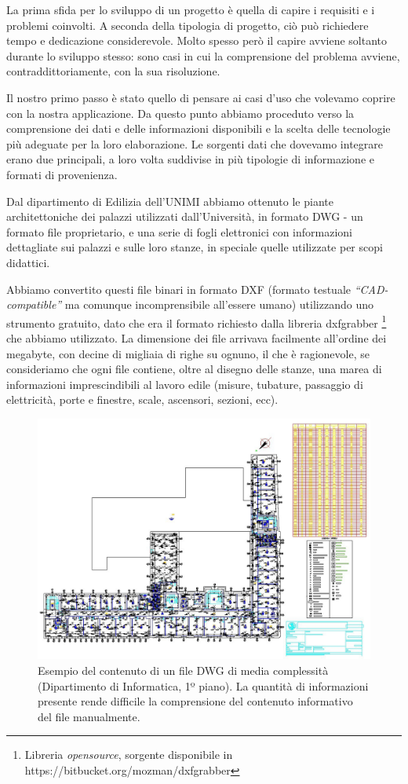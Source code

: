\documentclass[12pt]{report}
\begin{document}
La prima sfida per lo sviluppo di un progetto è quella di capire i
requisiti e i problemi coinvolti. A seconda della tipologia di
progetto, ciò può richiedere tempo e dedicazione considerevole. Molto
spesso però il capire avviene soltanto durante lo sviluppo stesso:
sono casi in cui la comprensione del problema avviene, contraddittoriamente,
con la sua risoluzione.

Il nostro primo passo è stato quello di pensare ai casi d'uso che
volevamo coprire con la nostra applicazione. Da questo punto abbiamo
proceduto verso la comprensione dei dati e delle informazioni
disponibili e la scelta delle tecnologie più adeguate per la loro
elaborazione. Le sorgenti dati che dovevamo integrare erano due
principali, a loro volta suddivise in più tipologie di informazione e
formati di provenienza.

Dal dipartimento di Edilizia dell'UNIMI abbiamo ottenuto le piante
architettoniche dei palazzi utilizzati dall'Università, in formato DWG
- un formato file proprietario, e una serie di fogli elettronici con
informazioni dettagliate sui palazzi e sulle loro stanze, in speciale
quelle utilizzate per scopi didattici.

Abbiamo convertito questi file binari in formato DXF (formato testuale
\textit{``CAD-compatible''} ma comunque incomprensibile all'essere
umano) utilizzando uno strumento gratuito, dato che era il formato
richiesto dalla libreria dxfgrabber \footnote{Libreria \textit{opensource},
sorgente disponibile in https://bitbucket.org/mozman/dxfgrabber} che abbiamo
utilizzato. La dimensione dei file arrivava facilmente all'ordine dei
megabyte, con decine di migliaia di righe su ognuno, il che è ragionevole, se
consideriamo che ogni file contiene, oltre al disegno delle stanze, una marea
di informazioni imprescindibili al lavoro edile (misure, tubature, passaggio
di elettricità, porte e finestre, scale, ascensori, sezioni, ecc).

\begin{figure}[h]
    \centering
    \includegraphics[width=\textwidth]{03-dxf-chaos.jpg}
    \caption{Esempio del contenuto di un file DWG di media complessità
(Dipartimento di Informatica, 1º piano). La quantità di informazioni
presente rende difficile la comprensione del contenuto informativo
del file manualmente. }
    \label{fig:dxf_chaos}
\end{figure}
\end{document}
